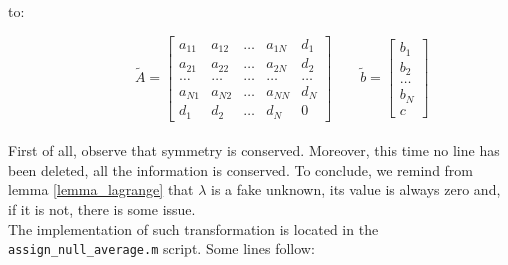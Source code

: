 \documentclass[a4paper,11pt]{article}
\begin{document}
to:

\begin{equation*}
\quad \quad  \quad \, \tilde{A}=\begin{bmatrix}
a_{11} & a_{12} & \dots & a_{1N} & d_1\\ 
a_{21} & a_{22} & \dots & a_{2N} & d_2 \\ 
\dots & \dots & \dots & \dots & \dots \\
a_{N1}  & a_{N2} & \dots & a_{NN} & d_N \\
d_1 & d_2 & \dots & d_N & 0
\end{bmatrix} \quad \quad
\tilde{b}=\begin{bmatrix}
b_1 \\ b_2 \\ \dots \\ b_N \\ c
\end{bmatrix}
\end{equation*}
\vspace{3mm} \\
\noindent First of all, observe that symmetry is conserved. Moreover, this time no line has been deleted, all the information is conserved. To conclude, we remind from lemma \ref{lemma_lagrange} that $\lambda$ is a fake unknown, its value is always zero and, if it is not, there is some issue. \\

\noindent The implementation of such transformation is located in the \texttt{assign\_null\_average.m} script. Some lines follow: \\
\end{document}
